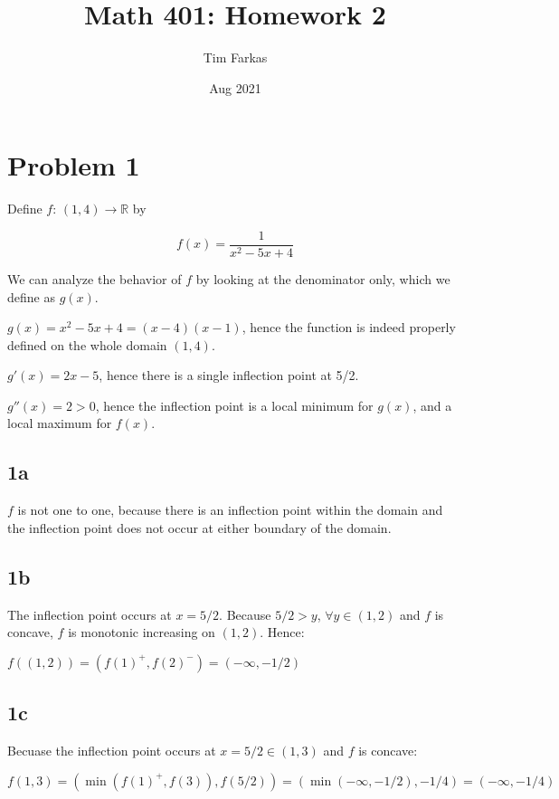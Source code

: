 \documentclass{article}
\title{Math 401: Homework 2}
\author{Tim Farkas}
\date{Aug 2021}
\begin{document}
\maketitle

\section*{Problem 1}
Define $f$: $(1,4) \rightarrow \mathbb{R}$ by 

\begin{equation*}
  f(x) = \frac{1}{x^2 - 5x + 4}
\end{equation*} 

We can analyze the behavior of $f$ by looking at the denominator only, which we define as $g(x)$.  

$g(x) = x^2 - 5x + 4 = (x - 4)(x - 1)$, hence the function is indeed properly defined on the whole domain $(1,4)$. 

$g'(x) = 2x - 5$, hence there is a single inflection point at 5/2. 

$g''(x) = 2 > 0$, hence the inflection point is a local minimum for $g(x)$, and a local maximum for $f(x)$. 

\subsection*{1a}

$f$ is not one to one, because there is an inflection point within the domain and the inflection point does not occur at either boundary of the domain.

\subsection*{1b}

The inflection point occurs at $x = 5/2$. Because $5/2 > y$, $ \forall y \in (1, 2)$ and $f$ is concave, $f$ is monotonic increasing on $(1,2)$. Hence: 

$f((1, 2)) = (f(1)^+, f(2)^-) = (-\infty, -1/2)$

\subsection*{1c}

Becuase the inflection point occurs at $x = 5/2 \in (1,3)$ and $f$ is concave:

$f(1,3) = (\min(f(1)^+, f(3)), f(5/2)) = (\min(-\infty, -1/2), -1/4) = (-\infty, -1/4)$
\end{document}

